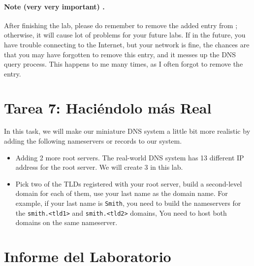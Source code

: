 \paragraph{ Note (very very important) .} 
After finishing the lab, please do remember to remove the added entry
from ; otherwise, it will 
cause lot of problems for your future labs. If in the future,
you have trouble connecting to the Internet, but your network is fine, 
the chances are that you may have forgotten to remove this entry, and it 
messes up the DNS query process. This happens to me many times,
as I often forgot to remove the entry.


\section{Tarea 7: Haciéndolo más Real}


In this task, we will make our miniature DNS system
a little bit more realistic by adding the following 
nameservers or records to our system. 


\begin{itemize}
\item Adding 2 more root servers. The real-world DNS system has 13 different 
IP address for the root server. We will create 3 in this lab.


\item Pick two of the TLDs registered with your root server, 
build a second-level domain for each of them, use your last name as the domain name. 
For example, if your last name is \texttt{Smith}, you need to build the 
nameservers for the \texttt{smith.<tld1>} and \texttt{smith.<tld2>} domains,
You need to host both domains on the same nameserver. 
\end{itemize}





 


\section{Informe del Laboratorio}

